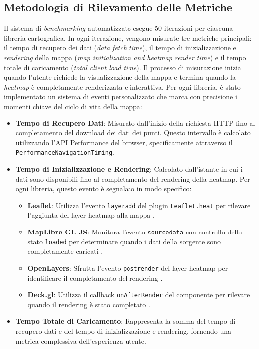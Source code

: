 \subsection{Metodologia di Rilevamento delle Metriche}

Il sistema di \textit{benchmarking} automatizzato esegue 50 iterazioni per ciascuna
libreria cartografica. In ogni iterazione, vengono misurate tre metriche principali:
il tempo di recupero dei dati (\textit{data fetch time}), il tempo di
inizializzazione e \textit{rendering} della mappa (\textit{map initialization
and heatmap render time}) e il tempo totale di caricamento (\textit{total client
load time}). Il processo di misurazione inizia quando l'utente richiede la
visualizzazione della mappa e termina quando la \textit{heatmap} è completamente
renderizzata e interattiva. Per ogni libreria, è stato implementato un sistema di
eventi personalizzato che marca con precisione i momenti chiave del ciclo di vita
della mappa:

\begin{itemize}
  \item \textbf{Tempo di Recupero Dati}: Misurato dall'inizio della richiesta HTTP
    fino al completamento del download dei dati dei punti. Questo intervallo è
    calcolato utilizzando l'API Performance del browser, specificamente attraverso
    il \texttt{PerformanceNavigationTiming}.

  \item \textbf{Tempo di Inizializzazione e Rendering}: Calcolato dall'istante in
    cui i dati sono disponibili fino al completamento del rendering della heatmap.
    Per ogni libreria, questo evento è segnalato in modo specifico:
    \begin{itemize}
      \item \textbf{Leaflet}: Utilizza l'evento \texttt{layeradd} del plugin
        \texttt{Leaflet.heat} per rilevare l'aggiunta del layer heatmap alla mappa
        \cite{leaflet-heat}.

      \item \textbf{MapLibre GL JS}: Monitora l'evento \texttt{sourcedata} con
        controllo dello stato \texttt{loaded} per determinare quando i dati della
        sorgente sono completamente caricati \cite{maplibre-sourcedata}.

      \item \textbf{OpenLayers}: Sfrutta l'evento \texttt{postrender} del layer
        heatmap per identificare il completamento del rendering
        \cite{openlayers-heatmap}.

      \item \textbf{Deck.gl}: Utilizza il callback \texttt{onAfterRender} del
        componente per rilevare quando il rendering è stato completato
        \cite{deckgl-onafterrender}.
    \end{itemize}

  \item \textbf{Tempo Totale di Caricamento}: Rappresenta la somma del tempo di recupero
    dati e del tempo di inizializzazione e rendering, fornendo una metrica
    complessiva dell'esperienza utente.
\end{itemize}

